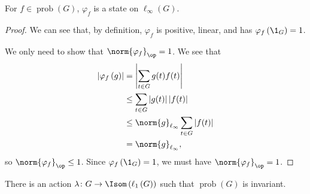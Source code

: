 \documentclass[10pt]{mypackage2}
\begin{document}
\begin{fact}\label{fact:prob_g_state}
  For $f\in \operatorname{prob}(G)$, $\varphi_f$ is a state on $\ell_{\infty}\left(G\right)$.
\end{fact}
\begin{proof}
We can see that, by definition, $\varphi_f$ is positive, linear, and has $\varphi_f\left(\1_{G}\right) = 1$.\newline

We only need to show that $\norm{\varphi_f}_{\op} = 1$. We see that
\begin{align*}
  \left\vert \varphi_f\left(g\right) \right\vert &= \left\vert \sum_{t\in G}g(t)f(t) \right\vert\\
                                                 &\leq \sum_{t\in G}\left\vert g(t) \right\vert\left\vert f(t) \right\vert\\
                                                 &\leq \norm{g}_{\ell_\infty}\sum_{t\in G}\left\vert f(t) \right\vert\\
                                                 &= \norm{g}_{\ell_\infty},
\end{align*}
so $\norm{\varphi_f}_{\op} \leq 1$. Since $\varphi_f\left(\1_G\right) = 1$, we must have $\norm{\varphi_f}_{\op} = 1$.
\end{proof}
\begin{proposition}
  There is an action $\lambda\colon G\rightarrow \Isom\left(\ell_{1}\left(G\right)\right)$ such that $\operatorname{prob}(G)$ is invariant.
\end{proposition}
\end{document}
